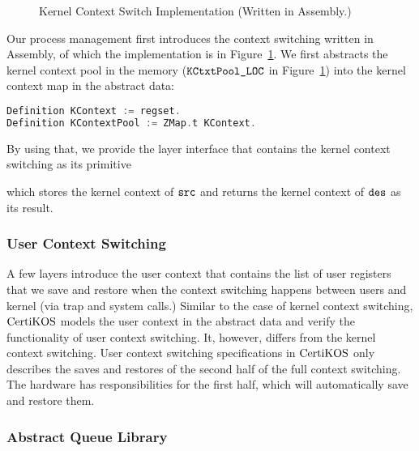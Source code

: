 \begin{figure}
 
\caption{Kernel Context Switch Implementation (Written in Assembly.)}
\label{fig:chapter:certikos:kernel-context-switch-impl}
\end{figure}
Our process management first introduces the context switching written in Assembly, of which the implementation is in Figure~\ref{fig:chapter:certikos:kernel-context-switch-impl}.
We first abstracts the kernel context pool in the memory (${\mathrm{\texttt{KCtxtPool\_LOC}}}$ in Figure~\ref{fig:chapter:certikos:kernel-context-switch-impl}) 
into the kernel context map in the abstract data:
\begin{lstlisting}[language = C]
Definition KContext := regset.
Definition KContextPool := ZMap.t KContext.
\end{lstlisting}
By using that, we provide the layer interface that contains the kernel context switching as its primitive

which stores the kernel context of ${\mathrm{\texttt{src}}}$ and returns the kernel context of ${\mathrm{\texttt{des}}}$ as its result.


\subsubsection{User Context Switching}

A few layers introduce the user context that contains the list of user registers that we save and restore when 
the context switching happens between users and kernel (via trap and system calls.)
Similar to the case of kernel context switching, $\mathrm{CertiKOS}$ models the user context in the abstract data and verify the functionality of user context switching. 
It, however, differs from the kernel context switching.
User context switching specifications in $\mathrm{CertiKOS}$ only describes the saves and restores of the second half of the full context switching.
The hardware has responsibilities for the first half, which will automatically save and restore them.


\subsubsection{Abstract Queue Library}

